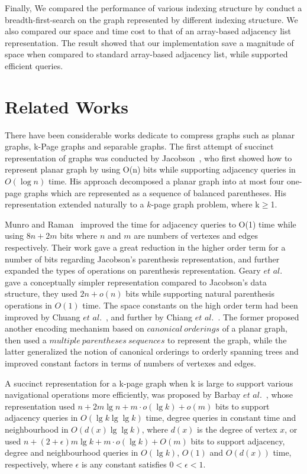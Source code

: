 \documentclass[12pt,glossary]{dalthesis}
\begin{document}
\bigskip
\bigskip

Finally, We compared the performance of various indexing structure by conduct a breadth-first-search on the graph represented by different indexing structure. We also compared our space and time cost to that of an array-based adjacency list representation. The result showed that our implementation save a magnitude of space when compared to standard array-based adjacency list, while supported efficient queries.   

\section{Related Works}

There have been considerable works dedicate to compress graphs such as planar graphs, k-Page graphs and separable graphs. The first attempt of succinct representation of graphs was conducted by Jacobson~\cite{Jacobson}, who first showed how to represent planar graph by using O(n) bits while supporting adjacency queries in $O(\log n)$ time. His approach decomposed a planar graph into at most four one-page graphs which are represented as a sequence of balanced parentheses. His representation extended naturally to a $k$-page graph problem, where k$\geq$1.

\bigskip
\bigskip

Munro and Raman~\cite{Munro} improved the time for adjacency queries to O(1) time while using $8n+2m$ bits where $n$ and $m$ are numbers of vertexes and edges respectively. Their work gave a great reduction in the higher order term for a number of bits regarding Jacobson's parenthesis representation, and further expanded the types of operations on parenthesis representation. Geary $et$ $al.$~\cite{Geary} gave a conceptually simpler representation compared to Jacobson's data structure, they used $2n+o(n)$ bits while supporting natural parenthesis operations in $O(1)$ time. The space constants on the high order term had been improved by Chuang $et$ $al.$~\cite{Chuang}, and further by Chiang $et$ $al.$~\cite{Chiang}. The former proposed another encoding mechanism based on $canonical \ orderings$ of a planar graph, then used a $multiple \ parentheses \ sequences$ to represent the graph, while the latter generalized the notion of canonical orderings to orderly spanning trees and improved constant factors in terms of numbers of vertexes and edges. 

\bigskip
\bigskip

A succinct representation for a k-page graph when k is large to support various navigational
operations more efficiently, was proposed by Barbay $et$ $al.$~\cite{Barbay}, whose representation used $n+2m\lg n + m \cdot o(\lg k) + o(m)$ bits to support adjacency queries in $O(\lg k \lg \lg k)$ time, degree queries in constant time and neighbourhood in $O(d(x) \lg \lg k)$, where $d(x)$ is the degree of vertex $x$, or used $n+(2+\epsilon)m\lg k + m \cdot o(\lg k) + O(m)$ bits to support adjacency, degree and neighbourhood queries in $O(\lg k)$, $O(1)$ and $O(d(x))$ time, respectively, where $\epsilon$ is any constant satisfies $0< \epsilon <1$.   
\end{document}

